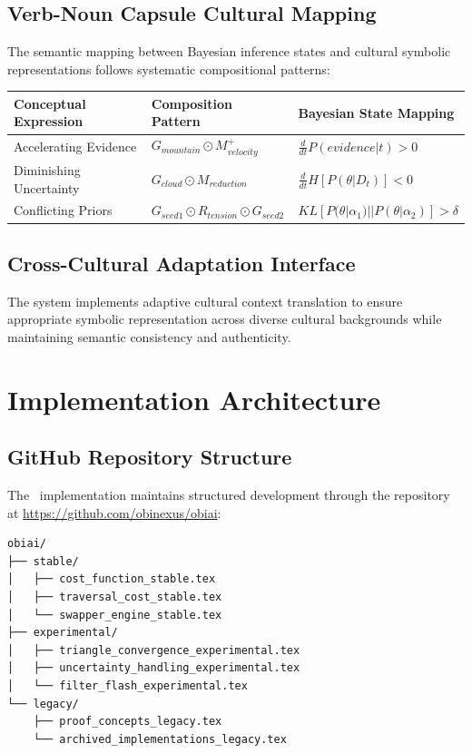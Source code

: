 \documentclass[12pt,twoside,openright]{report}
\begin{document}
\section{Verb-Noun Capsule Cultural Mapping}

The semantic mapping between Bayesian inference states and cultural symbolic representations follows systematic compositional patterns:

\begin{center}
\begin{tabular}{|l|l|l|}
\hline
\textbf{Conceptual Expression} & \textbf{Composition Pattern} & \textbf{Bayesian State Mapping} \\
\hline
Accelerating Evidence & $G_{mountain} \odot M^+_{velocity}$ & $\frac{d}{dt}P(evidence|t) > 0$ \\
Diminishing Uncertainty & $G_{cloud} \odot M_{reduction}$ & $\frac{d}{dt}H[P(\theta|D_t)] < 0$ \\
Conflicting Priors & $G_{seed1} \odot R_{tension} \odot G_{seed2}$ & $KL[P(\theta|\alpha_1)||P(\theta|\alpha_2)] > \delta$ \\
\hline
\end{tabular}
\end{center}

\section{Cross-Cultural Adaptation Interface}

The system implements adaptive cultural context translation to ensure appropriate symbolic representation across diverse cultural backgrounds while maintaining semantic consistency and authenticity.

\chapter{Implementation Architecture}

\section{GitHub Repository Structure}

The \obiai\ implementation maintains structured development through the repository at \url{https://github.com/obinexus/obiai}:

\begin{lstlisting}[caption=Repository Structure]
obiai/
├── stable/
│   ├── cost_function_stable.tex
│   ├── traversal_cost_stable.tex
│   └── swapper_engine_stable.tex
├── experimental/
│   ├── triangle_convergence_experimental.tex
│   ├── uncertainty_handling_experimental.tex
│   └── filter_flash_experimental.tex
└── legacy/
    ├── proof_concepts_legacy.tex
    └── archived_implementations_legacy.tex
\end{lstlisting}
\end{document}
